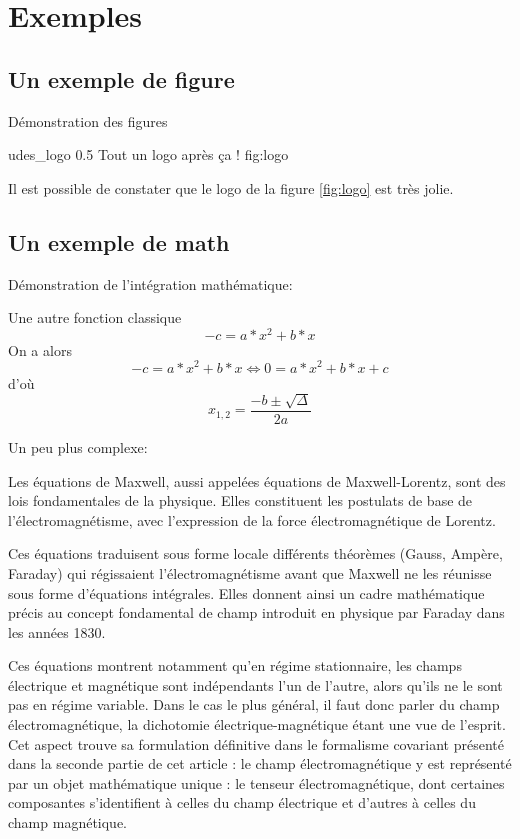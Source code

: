 \documentclass{udes_rapport} %
\begin{document}
\section{Exemples}


\subsection{Un exemple de figure}

Démonstration des figures

\inclureFigure
    {udes_logo}
    {0.5}
    {Tout un logo après ça !}
    {fig:logo}
    
Il est possible de constater que le logo de la figure \ref{fig:logo} est très jolie.


\subsection{Un exemple de math}


Démonstration de l'intégration mathématique:

Une autre fonction classique
\begin{equation}
   -c = a*x^2 + b*x
\end{equation}
On a alors
\begin{equation}
   -c = a*x^2 + b*x \iff 0 = a*x^2 + b*x + c
\end{equation}
d'où 
\begin{equation}
x_{1,2} = \frac{- b \pm \sqrt{\Delta}}{2a} 
\end{equation}

Un peu plus complexe:

Les équations de Maxwell, aussi appelées équations de Maxwell-Lorentz, sont des lois fondamentales de la physique. Elles constituent les postulats de base de l'électromagnétisme, avec l'expression de la force électromagnétique de Lorentz.

Ces équations traduisent sous forme locale différents théorèmes (Gauss, Ampère, Faraday) qui régissaient l'électromagnétisme avant que Maxwell ne les réunisse sous forme d'équations intégrales. Elles donnent ainsi un cadre mathématique précis au concept fondamental de champ introduit en physique par Faraday dans les années 1830.

Ces équations montrent notamment qu'en régime stationnaire, les champs électrique et magnétique sont indépendants l'un de l'autre, alors qu'ils ne le sont pas en régime variable. Dans le cas le plus général, il faut donc parler du champ électromagnétique, la dichotomie électrique-magnétique étant une vue de l'esprit. Cet aspect trouve sa formulation définitive dans le formalisme covariant présenté dans la seconde partie de cet article : le champ électromagnétique y est représenté par un objet mathématique unique : le tenseur électromagnétique, dont certaines composantes s'identifient à celles du champ électrique et d'autres à celles du champ magnétique.
\end{document}
